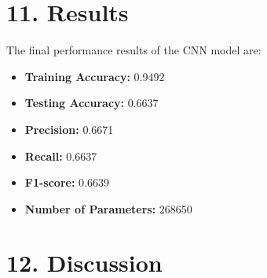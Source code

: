 \documentclass[11pt]{article}
\begin{document}
\section*{11. Results}

The final performance results of the CNN model are:

\begin{itemize}
\item \textbf{Training Accuracy:} 0.9492
\item \textbf{Testing Accuracy:} 0.6637
\item \textbf{Precision:} 0.6671
\item \textbf{Recall:} 0.6637
\item \textbf{F1-score:} 0.6639
\item \textbf{Number of Parameters:} 268650
\end{itemize}

\section*{12. Discussion}
\end{document}
